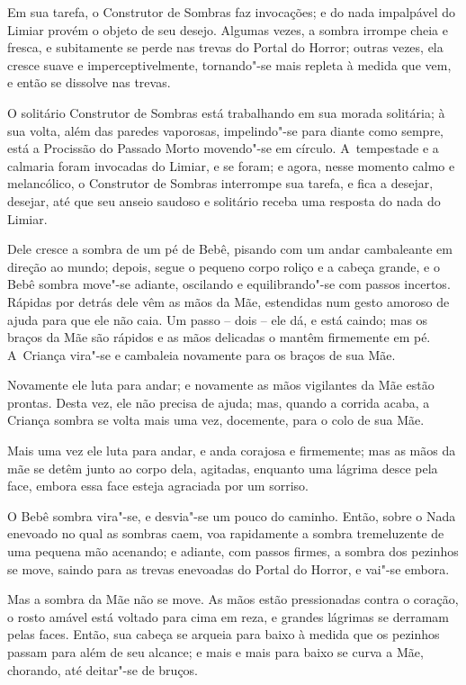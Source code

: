 Em sua tarefa, o Construtor de Sombras faz invocações; e do nada
impalpável do Limiar provém o objeto de seu desejo. Algumas vezes, a
sombra irrompe cheia e fresca, e subitamente se perde nas trevas do
Portal do Horror; outras vezes, ela cresce suave e imperceptivelmente,
tornando"-se mais repleta à medida que vem, e então se dissolve nas trevas.

\smallskip
O solitário Construtor de Sombras está trabalhando em sua morada
solitária; à sua volta, além das paredes vaporosas, impelindo"-se para
diante como sempre, está a Procissão do Passado Morto movendo"-se em
círculo. A~tempestade e a calmaria foram invocadas do Limiar, e se
foram; e agora, nesse momento calmo e melancólico, o Construtor de
Sombras interrompe sua tarefa, e fica a desejar, desejar, até que seu
anseio saudoso e solitário receba uma resposta do nada do Limiar.

Dele cresce a sombra de um pé de Bebê, pisando com um andar cambaleante
em direção ao mundo; depois, segue o pequeno corpo roliço e a cabeça
grande, e o Bebê sombra move"-se adiante, oscilando e equilibrando"-se com
passos incertos. Rápidas por detrás dele vêm as mãos da Mãe, estendidas
num gesto amoroso de ajuda para que ele não caia. Um passo -- dois --
ele dá, e está caindo; mas os braços da Mãe são rápidos e as mãos
delicadas o mantêm firmemente em pé. A~Criança vira"-se e cambaleia
novamente para os braços de sua Mãe.

Novamente ele luta para andar; e novamente as mãos vigilantes da Mãe
estão prontas. Desta vez, ele não precisa de ajuda; mas, quando a
corrida acaba, a Criança sombra se volta mais uma vez, docemente, para o
colo de sua Mãe.

Mais uma vez ele luta para andar, e anda corajosa e firmemente; mas as
mãos da mãe se detêm junto ao corpo dela, agitadas, enquanto uma lágrima
desce pela face, embora essa face esteja agraciada por um sorriso.

O Bebê sombra vira"-se, e desvia"-se um pouco do caminho. Então, sobre o
Nada enevoado no qual as sombras caem, voa rapidamente a sombra
tremeluzente de uma pequena mão acenando; e adiante, com passos firmes,
a sombra dos pezinhos se move, saindo para as trevas enevoadas do Portal
do Horror, e vai"-se embora.

Mas a sombra da Mãe não se move. As mãos estão pressionadas contra o
coração, o rosto amável está voltado para cima em reza, e grandes
lágrimas se derramam pelas faces. Então, sua cabeça se arqueia para
baixo à medida que os pezinhos passam para além de seu alcance; e mais e
mais para baixo se curva a Mãe, chorando, até deitar"-se de bruços.

